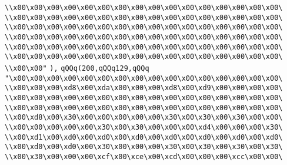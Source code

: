\verb|\\x00\x00\x00\x00\x00\x00\x00\x00\x00\x00\x00\x00\x00\x00\x00\x00\|\newline
\verb|\\x00\x00\x00\x00\x00\x00\x00\x00\x00\x00\x00\x00\x00\x00\x00\x00\|\newline
\verb|\\x00\x00\x00\x00\x00\x00\x00\x00\x00\x00\x00\x00\x00\x00\x00\x00\|\newline
\verb|\\x00\x00\x00\x00\x00\x00\x00\x00\x00\x00\x00\x00\x00\x00\x00\x00\|\newline
\verb|\\x00\x00\x00\x00\x00\x00\x00\x00\x00\x00\x00\x00\x00\x00\x00\x00\|\newline
\verb|\\x00\x00\x00\x00\x00\x00\x00\x00\x00\x00\x00\x00\x00\x00\x00\x00\|\newline
\verb|\\x00\x00"|\newline
\verb|),|\newline
\verb|qQQq(200,qQQq129,qQQq|\newline
\verb|"\x00\x00\x00\x00\x00\x00\x00\x00\x00\x00\x00\x00\x00\x00\x00\x00\|\newline
\verb|\\x00\x00\x00\xd8\x00\xda\x00\x00\x00\xd8\x00\xd9\x00\x00\x00\x00\|\newline
\verb|\\x00\x00\x00\x00\x00\x00\x00\x00\x00\x00\x00\x00\x00\x00\x00\x00\|\newline
\verb|\\x00\x00\x00\x00\x00\x00\x00\x00\x00\x00\x00\x00\x00\x00\x00\x00\|\newline
\verb|\\x00\xd8\x00\x30\x00\x00\x00\x00\x00\x30\x00\x30\x00\x30\x00\x00\|\newline
\verb|\\x00\x00\x00\x00\x00\x30\x00\x30\x00\x00\x00\xd4\x00\x00\x00\x30\|\newline
\verb|\\x00\xd1\x00\xd0\x00\xd0\x00\xd0\x00\xd0\x00\xd0\x00\xd0\x00\xd0\|\newline
\verb|\\x00\xd0\x00\xd0\x00\x30\x00\x00\x00\x30\x00\x30\x00\x30\x00\x30\|\newline
\verb|\\x00\x30\x00\x00\x00\xcf\x00\xce\x00\xcd\x00\x00\x00\xcc\x00\x00\|\newline
